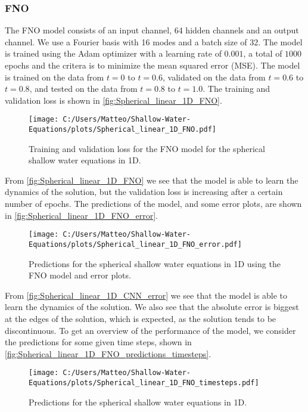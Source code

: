 \subsubsection{FNO}
The FNO model consists of an input channel, 64 hidden channels and an output channel. We use a Fourier basis with 16 modes and a batch size of 32.
The model is trained using the Adam optimizer with a learning rate of $0.001$, a total of $1000$ epochs and the critera is to minimize the mean squared error (MSE).
The model is trained on the data from $t = 0$ to $t = 0.6$, validated on the data from $t = 0.6$ to $t = 0.8$, and tested on the data from $t = 0.8$ to $t = 1.0$.
The training and validation loss is shown in \autoref{fig:Spherical_linear_1D_FNO}.
\begin{figure}[H]
    \centering
    \texttt{[image: C:/Users/Matteo/Shallow-Water-Equations/plots/Spherical\_linear\_1D\_FNO.pdf]}
    \caption{Training and validation loss for the FNO model for the spherical shallow water equations in 1D.}\label{fig:Spherical_linear_1D_FNO}
\end{figure}
From \autoref{fig:Spherical_linear_1D_FNO} we see that the model is able to learn the dynamics of the solution, but the validation loss is increasing after a certain number of epochs.
The predictions of the model, and some error plots, are shown in \autoref{fig:Spherical_linear_1D_FNO_error}.
\begin{figure}[H]
    \centering
    \texttt{[image: C:/Users/Matteo/Shallow-Water-Equations/plots/Spherical\_linear\_1D\_FNO\_error.pdf]}
    \caption{Predictions for the spherical shallow water equations in 1D using the FNO model and error plots.}\label{fig:Spherical_linear_1D_FNO_error}
\end{figure}
From \autoref{fig:Spherical_linear_1D_CNN_error} we see that the model is able to learn the dynamics of the solution.
We also see that the absolute error is biggest at the edges of the solution, which is expected, as the solution tends to be discontinuous.
To get an overview of the performance of the model, we consider the predictions for some given time steps, shown in \autoref{fig:Spherical_linear_1D_FNO_predictions_timesteps}.
\begin{figure}[H]
    \centering
    \texttt{[image: C:/Users/Matteo/Shallow-Water-Equations/plots/Spherical\_linear\_1D\_FNO\_timesteps.pdf]}
    \caption{Predictions for the spherical shallow water equations in 1D.}\label{fig:Spherical_linear_1D_FNO_predictions_timesteps}
\end{figure}
